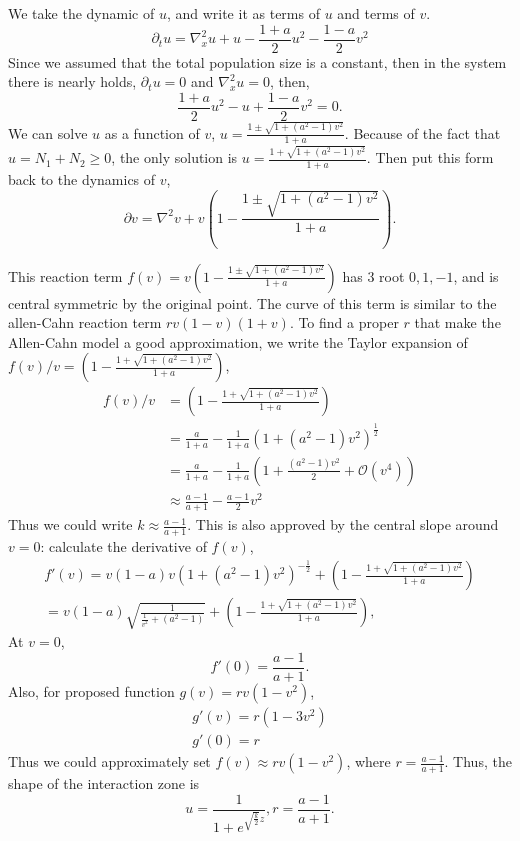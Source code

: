     We take the dynamic of $u$, and write it as terms of $u$ and terms of $v$.
    \begin{equation*}
        \partial_t u = \nabla^2_x u + u - \frac{1+a}{2} u^2 - \frac{1-a}{2} v^2
    \end{equation*}
    Since we assumed that the total population size is a constant, then in the system there is nearly holds, $\partial_t u = 0$ and $\nabla^2_x u=0$, then,
    \begin{equation*}
            \frac{1+a}{2}u^2 - u + \frac{1-a}{2}v^2 = 0.
    \end{equation*}
    We can solve $u$ as a function of $v$,
    $u = \frac{1\pm\sqrt{1+(a^2-1)v^2}}{1+a}$. Because of the fact that $u = N_1 + N_2 \geq 0$, the only solution is $u = \frac{1 + \sqrt{1+(a^2-1)v^2}}{1+a}$. Then put this form back to the dynamics of $v$,
    \begin{equation*}
        \partial v = \nabla^2 v + v (1 - \frac{1\pm\sqrt{1+(a^2-1)v^2}}{1+a}).
    \end{equation*}

    This reaction term $f(v) = v (1 - \frac{1\pm\sqrt{1+(a^2-1)v^2}}{1+a})$ has $3$ root $0,1,-1$, and is central symmetric by the original point. The curve of this term is similar to the allen-Cahn reaction term $rv(1-v)(1+v)$. To find a proper $r$ that make the Allen-Cahn model a good approximation, we write the Taylor expansion of $f(v)/v = (1 - \frac{1+\sqrt{1+(a^2-1)v^2}}{1+a})$,
    \begin{align*}
        f(v)/v &= (1 - \frac{1+\sqrt{1+(a^2-1)v^2}}{1+a})\\
                &= \frac{a}{1+a} - \frac{1}{1+a} (1+(a^2-1)v^2)^{\frac{1}{2}}\\
                &= \frac{a}{1+a} - \frac{1}{1+a} (1+\frac{(a^2-1)v^2}{2} + \mathcal{O}(v^4))\\
                &\approx \frac{a-1}{a+1}-\frac{a-1}{2}v^2
    \end{align*}
    Thus we could write $k\approx \frac{a-1}{a+1}$. This is also approved by the central slope around $v=0$: calculate the derivative of $f(v)$,
    \begin{align*}
        f'(v) = v(1-a)v (1+(a^2-1)v^2)^{-\frac{1}{2}}+(1 - \frac{1+\sqrt{1+(a^2-1)v^2}}{1+a})\\
        =v(1-a)\sqrt{\frac{1}{\frac{1}{v^2}+(a^2-1)}}+(1 - \frac{1+\sqrt{1+(a^2-1)v^2}}{1+a}),
    \end{align*}
    At $v = 0$,
    \begin{equation*}
        f'(0) = \frac{a-1}{a+1}.
    \end{equation*}
    Also, for proposed function $g(v) = rv(1-v^2)$,
    \begin{align*}
        g'(v) = r(1-3v^2)\\
        g'(0) = r
    \end{align*}
    Thus we could approximately set $f(v)\approx rv(1-v^2)$, where $r = \frac{a-1}{a+1}$. Thus, the shape of the interaction zone is
    \begin{equation*}
        u = \frac{1}{1+e^{\sqrt{\frac{k}{2}}z}},r = \frac{a-1}{a+1}.
    \end{equation*}

